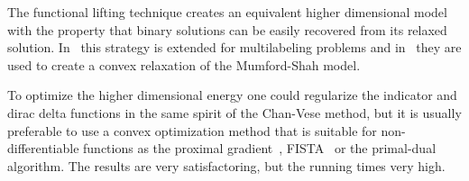 The functional lifting technique creates an equivalent higher dimensional model with the property that binary solutions can be easily recovered from its relaxed solution. In~\cite{pock08} this strategy is extended for multilabeling problems and in~\cite{pock09,strekalovskiy12} they are used to create a convex relaxation of the Mumford-Shah model.

To optimize the higher dimensional energy one could regularize the indicator and dirac delta functions in the same spirit of the Chan-Vese method, but it is usually preferable to use a convex optimization method that is suitable for non-differentiable functions as the proximal gradient~\cite{chambolle04}, FISTA~\cite{beck09a} or the primal-dual~\cite{chambolle11} algorithm. The results are very satisfactoring, but the running times  very high.










